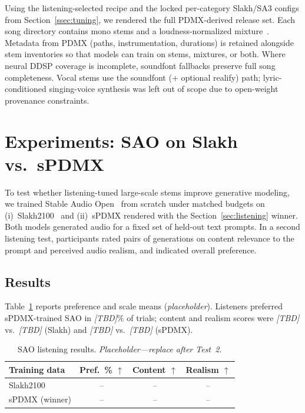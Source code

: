 \documentclass{article}
\begin{document}
Using the listening-selected recipe and the locked per-category Slakh/SA3 configs from Section~\ref{ssec:tuning}, we rendered the full PDMX-derived release set.
Each song directory contains mono stems and a loudness-normalized mixture~\cite{series2011algorithms}.
Metadata from PDMX (paths, instrumentation, durations) is retained alongside stem inventories so that models can train on stems, mixtures, or both.
Where neural DDSP coverage is incomplete, soundfont fallbacks preserve full song completeness.
Vocal stems use the soundfont (+ optional realify) path; lyric-conditioned singing-voice synthesis was left out of scope due to open-weight provenance constraints.

\section{Experiments: SAO on Slakh vs.\ sPDMX}
\label{sec:experiments}

To test whether listening-tuned large-scale stems improve generative modeling, we trained Stable Audio Open~\cite{evans2024stable} from scratch under matched budgets on (i)~Slakh2100~\cite{manilow2019cutting} and (ii)~sPDMX rendered with the Section~\ref{sec:listening} winner.
Both models generated audio for a fixed set of held-out text prompts.
In a second listening test, participants rated pairs of generations on content relevance to the prompt and perceived audio realism, and indicated overall preference.

\subsection{Results}
\label{ssec:sao_results}

Table~\ref{tab:sao} reports preference and scale means (\textit{placeholder}).
Listeners preferred sPDMX-trained SAO in \textit{[TBD]}\% of trials; content and realism scores were \textit{[TBD]} vs.\ \textit{[TBD]} (Slakh) and \textit{[TBD]} vs.\ \textit{[TBD]} (sPDMX).

\begin{table}[t]
\centering
\caption{SAO listening results. \textit{Placeholder---replace after Test~2.}}
\label{tab:sao}
\vspace{1mm}
\small
\begin{tabular}{@{}lccc@{}}
\toprule
Training data & Pref.\ \% $\uparrow$ & Content $\uparrow$ & Realism $\uparrow$ \\
\midrule
Slakh2100 & -- & -- & -- \\
sPDMX (winner) & -- & -- & -- \\
\bottomrule
\end{tabular}
\end{table}
\end{document}
